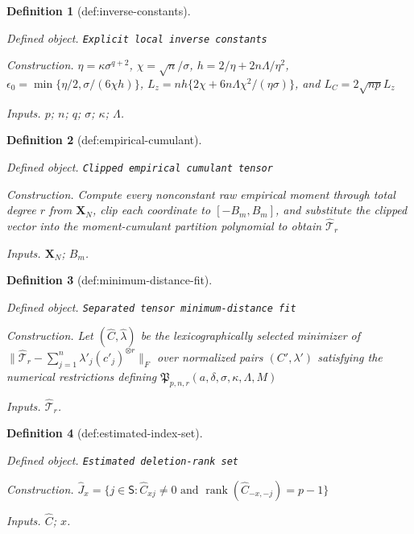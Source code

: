 \documentclass{article}
\newtheorem{definition}{Definition}
\begin{document}
\begin{definition}[def:inverse-constants]\label{def:inverse-constants}
\par\smallskip\noindent\emph{Defined object.} \texttt{Explicit local inverse constants}
\par\smallskip\noindent\emph{Construction.} \(\eta=\kappa\sigma^{q+2}\), \(\chi=\sqrt n/\sigma\), \(h=2/\eta+2n\Lambda/\eta^2\), \(\epsilon_0=\min\{\eta/2,\sigma/(6\chi h)\}\), \(L_z=nh\{2\chi+6n\Lambda\chi^2/(\eta\sigma)\}\), and \(L_C=2\sqrt{np}L_z\)
\par\smallskip\noindent\emph{Inputs.} \(p\); \(n\); \(q\); \(\sigma\); \(\kappa\); \(\Lambda\).
\end{definition}

\begin{definition}[def:empirical-cumulant]\label{def:empirical-cumulant}
\par\smallskip\noindent\emph{Defined object.} \texttt{Clipped empirical cumulant tensor}
\par\smallskip\noindent\emph{Construction.} Compute every nonconstant raw empirical moment through total degree \(r\) from \(\mathbf X_N\), clip each coordinate to \([-B_m,B_m]\), and substitute the clipped vector into the moment-cumulant partition polynomial to obtain \(\widehat{\mathcal T}_r\)
\par\smallskip\noindent\emph{Inputs.} \(\mathbf X_N\); \(B_m\).
\end{definition}

\begin{definition}[def:minimum-distance-fit]\label{def:minimum-distance-fit}
\par\smallskip\noindent\emph{Defined object.} \texttt{Separated tensor minimum-\allowbreak{}distance fit}
\par\smallskip\noindent\emph{Construction.} Let \((\widehat C,\widehat\lambda)\) be the lexicographically selected minimizer of \(\lVert\widehat{\mathcal T}_r-\sum_{j=1}^n\lambda'_j(c'_j)^{\otimes r}\rVert_F\) over normalized pairs \((C',\lambda')\) satisfying the numerical restrictions defining \(\mathfrak P_{p,n,r}(a,\delta,\sigma,\kappa,\Lambda,M)\)
\par\smallskip\noindent\emph{Inputs.} \(\widehat{\mathcal T}_r\).
\end{definition}

\begin{definition}[def:estimated-index-set]\label{def:estimated-index-set}
\par\smallskip\noindent\emph{Defined object.} \texttt{Estimated deletion-\allowbreak{}rank set}
\par\smallskip\noindent\emph{Construction.} \(\widehat J_x=\{j\in\mathsf S:\widehat C_{xj}\ne0\text{ and }\operatorname{rank}(\widehat C_{-x,-j})=p-1\}\)
\par\smallskip\noindent\emph{Inputs.} \(\widehat C\); \(x\).
\end{definition}
\end{document}
